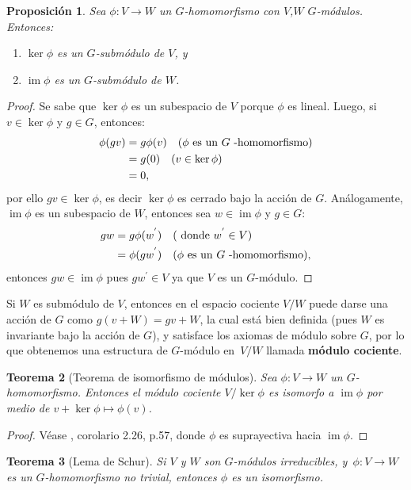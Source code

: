 \documentclass[12pt]{book}
\newtheorem{theorem}{Teorema}[section]
\newtheorem{proposition}[theorem]{Proposición}
\theoremstyle{definition}
\newcounter{in}
\newcounter{ini}
\DeclareMathOperator{\im}{im}
\begin{document}
\begin{mdframed}
\begin{proposition}
  \label{ker-im-sub}
  Sea $\phi:V\rightarrow W$ un $G$-homomorfismo con $V$,$W$
$G$-módulos. Entonces:
  \begin{enumerate}
  \item $\ker\phi$ es un $G$-submódulo de $V$, y
  \item $\im\phi$ es un $G$-submódulo de $W$.
  \end{enumerate}  
\end{proposition}  
\begin{proof}
Se sabe que $\ker\phi$ es un subespacio de $V$ porque $\phi$ es
lineal. Luego, si $v \in \ker \phi$ y $g \in G$, entonces:
\begin{equation}
\begin{aligned}
\phi (gv) & = g \phi (v) \quad (\phi \textup{ es un } G \textup{ -homomorfismo})\\
& = g(0) \quad (v \in \ker \phi) \\
& = 0,
\end{aligned}
\end{equation}
por ello $gv \in \ker \phi$, es decir $\ker \phi$ es cerrado bajo la
acción de $G$.  Análogamente, $\im \phi$ es un subespacio de $W$,
entonces sea $w \in \im \phi$ y $g \in G$:
\begin{equation}
\begin{aligned}
gw & = g \phi(w^{'}) \quad (\textup{ donde } w^{'} \in V)\\
& = \phi(gw^{'}) \quad (\phi \textup{ es un } G \textup{ -homomorfismo}),
\end{aligned}
\end{equation}
entonces $gw \in \im \phi$ pues $gw^{'} \in V$ ya que $V$ es un
$G$-módulo.
\end{proof}

Si $W$ es submódulo de $V$, entonces en el espacio cociente $V/W$
puede darse una acción de $G$ como $g(v+W)=gv+W$, la cual está bien
definida (pues $W$ es invariante bajo la acción de $G$), y satisface
los axiomas de módulo sobre $G$, por lo que obtenemos una estructura
de $G$-módulo en~$V/W$ llamada \textbf{módulo cociente}.

\begin{theorem}[Teorema de isomorfismo de módulos]
  \label{teorema-isomorfismo-mod}
  Sea $\phi:V\rightarrow W$ un $G$-homomorfismo. Entonces el
  módulo cociente $V/\ker\phi$ es isomorfo a $\im\phi$ por medio de
  $v+\ker\phi\mapsto\phi(v)$.
\end{theorem}
\begin{proof}
  Véase \cite{knapp2007basic}, corolario 2.26, p.57, donde $\phi$ es
  suprayectiva hacia $\im\phi$.
\end{proof}
\begin{theorem}[Lema de Schur]
  \label{lema-schur}
  Si $V$ y $W$ son $G$-módulos irreducibles, y~$\phi:V\rightarrow W$
  es un $G$-homomorfismo no trivial, entonces $\phi$ es un isomorfismo.
\end{theorem}


\end{mdframed}
\end{document}
